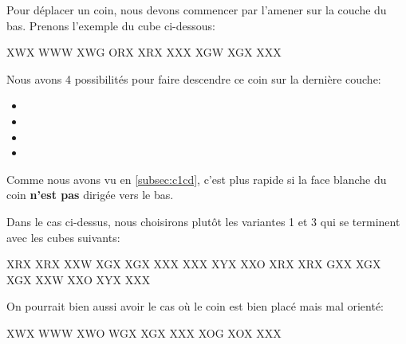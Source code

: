 Pour déplacer un coin, nous devons commencer par l'amener sur la couche du bas. Prenons l'exemple du cube ci-dessous:

\begin{center}
	\RubikFaceUp%
	{X}{W}{X}%
	{W}{W}{W}%
	{X}{W}{G}
	\RubikFaceRight%
	{O}{R}{X}%
	{X}{R}{X}%
	{X}{X}{X}
	\RubikFaceFront%
	{X}{G}{W}%
	{X}{G}{X}%
	{X}{X}{X}
\end{center}

Nous avons 4 possibilités pour faire descendre ce coin sur la dernière couche:

\begin{itemize}
	\item {}
	\item {}
	\item {}
	\item {}		
\end{itemize}

Comme nous avons vu en \ref{subsec:c1cd}, c'est plus rapide si la face blanche du coin \textbf{n'est pas} dirigée vers le bas.

\begin{samepage}
Dans le cas ci-dessus, nous choisirons plutôt les variantes 1 et 3 qui se terminent avec les cubes suivants:

\begin{center}
	
	\RubikFaceRight%
	{X}{R}{X}%
	{X}{R}{X}%
	{X}{X}{W}
	\RubikFaceFront%
	{X}{G}{X}%
	{X}{G}{X}%
	{X}{X}{X}
	\RubikFaceDown%
	{X}{X}{X}%
	{X}{Y}{X}%
	{X}{X}{O}
	\hspace*{1cm} 	
	\RubikFaceRight%
	{X}{R}{X}%
	{X}{R}{X}%
	{G}{X}{X}
	\RubikFaceFront%
	{X}{G}{X}%
	{X}{G}{X}%
	{X}{X}{W}
	\RubikFaceDown%
	{X}{X}{O}%
	{X}{Y}{X}%
	{X}{X}{X}
\end{center} 
\end{samepage}
	
On pourrait bien aussi avoir le cas où le coin est bien placé mais mal orienté:

\begin{center}
	\RubikFaceUp%
	{X}{W}{X}%
	{W}{W}{W}%
	{X}{W}{O}
	\RubikFaceRight%
	{W}{G}{X}%
	{X}{G}{X}%
	{X}{X}{X}
	\RubikFaceFront%
	{X}{O}{G}%
	{X}{O}{X}%
	{X}{X}{X}
\end{center}

